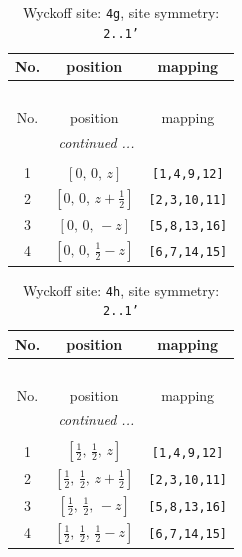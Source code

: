 \documentclass[fleqn,8pt]{jsarticle}
\begin{document}
\begin{longtable}{ccc}
\caption{Wyckoff site: {\tt 4g}, site symmetry: {\tt 2..1'}}
 \\
 \hline \hline
No. & position & mapping \\ \hline \endfirsthead

\multicolumn{2}{l}{\tablename\ \thetable{}} \\
 \hline \hline
No. & position & mapping \\ \hline \endhead

 \hline \hline
\multicolumn{2}{r}{\footnotesize\it continued ...} \\ \endfoot

 \hline \hline
\multicolumn{2}{r}{} \\ \endlastfoot

1 & $\left[ 0,\, 0,\, z \right]$ & {\tt [1,4,9,12]} \\ \hline
2 & $\left[ 0,\, 0,\, z + \frac{1}{2} \right]$ & {\tt [2,3,10,11]} \\ \hline
3 & $\left[ 0,\, 0,\, - z \right]$ & {\tt [5,8,13,16]} \\ \hline
4 & $\left[ 0,\, 0,\, \frac{1}{2} - z \right]$ & {\tt [6,7,14,15]} \\
\end{longtable}
\renewcommand{\arraystretch}{1.2}
\begin{longtable}{ccc}
\caption{Wyckoff site: {\tt 4h}, site symmetry: {\tt 2..1'}}
 \\
 \hline \hline
No. & position & mapping \\ \hline \endfirsthead

\multicolumn{2}{l}{\tablename\ \thetable{}} \\
 \hline \hline
No. & position & mapping \\ \hline \endhead

 \hline \hline
\multicolumn{2}{r}{\footnotesize\it continued ...} \\ \endfoot

 \hline \hline
\multicolumn{2}{r}{} \\ \endlastfoot

1 & $\left[ \frac{1}{2},\, \frac{1}{2},\, z \right]$ & {\tt [1,4,9,12]} \\ \hline
2 & $\left[ \frac{1}{2},\, \frac{1}{2},\, z + \frac{1}{2} \right]$ & {\tt [2,3,10,11]} \\ \hline
3 & $\left[ \frac{1}{2},\, \frac{1}{2},\, - z \right]$ & {\tt [5,8,13,16]} \\ \hline
4 & $\left[ \frac{1}{2},\, \frac{1}{2},\, \frac{1}{2} - z \right]$ & {\tt [6,7,14,15]} \\
\end{longtable}
\end{document}
